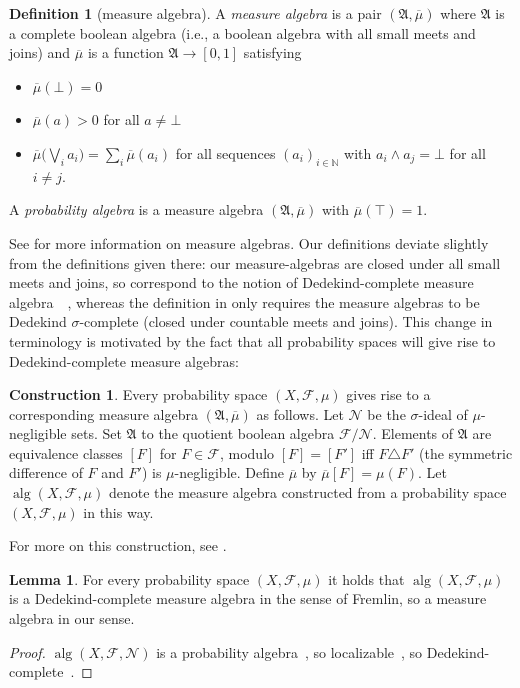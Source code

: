 \documentclass[
  sigconf,
  screen, ]{acmart}
\theoremstyle{definition}
\newtheorem{lemma}[theorem]{Lemma}
\newtheorem{construction}[theorem]{Construction}
\newtheorem{definition}[theorem]{Definition}
\newcommand\calF{\mathcal F}
\newcommand\calN{\mathcal N}
\newcommand\N{\mathbb N}
\newcommand\frakA{\mathfrak A}
\newcommand\fremlinft[3]{\citet[\href{https://www1.essex.ac.uk/maths/people/fremlin/chap#2.pdf\#page=#3}{#1}]{fremlin2000measure}}
\newcommand\fremlinf[3]{\cite[\href{https://www1.essex.ac.uk/maths/people/fremlin/chap#2.pdf\#page=#3}{#1}]{fremlin2000measure}}
\newcommand\nref[2]{\hyperref[#1]{#2}} \newcommand\checkhigh{{\huge{\color{red}\textbf{TODO: check}}}}
\newcommand\measalg{\operatorname{\nref{app:cons:measalg}{alg}}}
\begin{document}
\begin{definition}[measure algebra] \label{app:def:measalg}
  A \emph{measure algebra} 
  is a pair $(\frakA,\overline\mu)$
  where $\frakA$ is a complete boolean algebra
  (i.e., a boolean algebra with all small meets and joins)
  and $\overline\mu$ is a function $\frakA\to[0,1]$
  satisfying \begin{itemize}
    \item $\overline\mu(\bot) = 0$
    \item $\overline\mu(a) > 0$ for all $a\ne\bot$
    \item $\overline\mu \big(\bigvee_i a_i\big) = \sum_i \overline\mu(a_i)$
      for all sequences $(a_i)_{i\in \N}$
      with $a_i\wedge a_j = \bot$ for all $i\ne j$.
  \end{itemize}
  A \emph{probability algebra} 
  is a measure algebra $(\frakA,\overline\mu)$
  with $\overline\mu(\top) = 1$.
\end{definition}

See \fremlinft{321A}{32}{1} for more information on measure algebras.
Our definitions deviate slightly from the definitions given there:
our measure-algebras are
closed under all small meets and joins,
so correspond to the notion of Dedekind-complete
measure algebra~~\fremlinf{314A(a)}{31}{32}, whereas the definition in
\fremlinft{321A}{32}{1} only requires the measure algebras
to be Dedekind $\sigma$-complete (closed under countable meets and joins).
This change in terminology is motivated
by the fact that all probability spaces will give rise to
Dedekind-complete measure algebras:

\begin{construction} \label{app:cons:measalg}
  Every probability space $(X,\calF,\mu)$
  gives rise to a corresponding measure algebra $(\frakA,\overline\mu)$
  as follows. Let $\calN$ be the $\sigma$-ideal of $\mu$-negligible sets.
  Set $\frakA$ to the quotient boolean algebra $\calF/\calN$.
  Elements of $\frakA$ are equivalence classes $[F]$ for $F\in\calF$,
  modulo $[F] = [F']$ iff $F\triangle F'$ (the symmetric difference of $F$ and $F'$)
  is $\mu$-negligible.
  Define $\overline\mu$ by $\overline\mu[F] = \mu(F)$.
  Let $\measalg(X,\calF,\mu)$
  denote the measure algebra constructed from
  a probability space $(X,\calF,\mu)$ in this way.
\end{construction}

For more on this construction, see \fremlinft{321H}{32}{3}.

\begin{lemma} \label{app:lem:sigalg-mod-negl-cba}
  For every probability space $(X,\calF,\mu)$
  it holds that $\measalg(X,\calF,\mu)$
  is a Dedekind-complete measure algebra in the sense of
  Fremlin, so a measure algebra in our sense.
\end{lemma}
\begin{proof}
  $\measalg(X,\calF,\calN)$
  is a probability algebra~\fremlinf{322A(a)}{32}{5},
  so localizable~\fremlinf{322C}{32}{6},
  so Dedekind-complete~\fremlinf{322A(e)}{32}{5}.
\end{proof}
\end{document}
